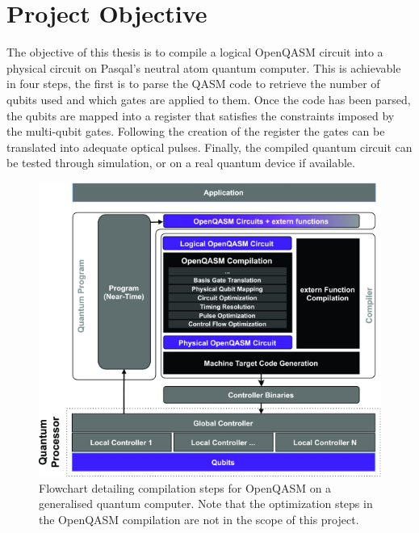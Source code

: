 \section{Project Objective}
\label{sec:objective}

The objective of this thesis is to compile a logical OpenQASM circuit into a physical circuit on Pasqal's neutral atom quantum computer. 
This is achievable in four steps, the first is to parse the QASM code to retrieve the number of qubits 
used and which gates are applied to them. Once the code has been parsed, the qubits are mapped into a register that satisfies the constraints imposed by the multi-qubit gates. Following the creation of the register 
the gates can be translated into adequate optical pulses. 
Finally, the compiled quantum circuit can be tested through simulation, or on a real quantum device if available.
\begin{figure}[H]
    \includegraphics[scale=16]{./Images/compilation_chart.jpg}
    \caption{Flowchart detailing compilation steps for OpenQASM on a generalised quantum computer. Note that the optimization steps in the OpenQASM compilation are not in the scope of this project.} 
    \label{fig:compchart}
  \end{figure}